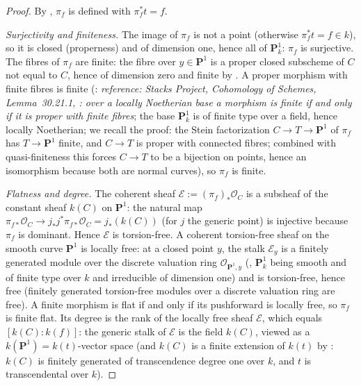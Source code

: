 \begin{proof}
By , \(\pi_f\) is defined
with \(\pi_f^*t=f\).

\emph{Surjectivity and finiteness.}  The image of \(\pi_f\) is not a
point (otherwise \(\pi_f^*t=f\in k\)), so it is closed (properness)
and of dimension one, hence all of \(\mathbf P^1_k\): \(\pi_f\) is
surjective.  The fibres of \(\pi_f\) are finite: the fibre over
\(y\in\mathbf P^1\) is a proper closed subscheme of \(C\) not equal
to \(C\), hence of dimension zero and finite by
.  A proper morphism with finite fibres is
finite (:
\emph{reference: Stacks Project, Cohomology of Schemes,
Lemma~30.21.1, : over a locally Noetherian base a
morphism is finite if and only if it is proper with finite fibres};
the base \(\mathbf P^1_k\) is of finite type over a field, hence
locally Noetherian; we
recall the proof: the Stein factorization
\(C\to T\to\mathbf P^1\) of \(\pi_f\) has \(T\to\mathbf P^1\) finite,
and \(C\to T\) is proper with connected fibres; combined with
quasi-finiteness this forces \(C\to T\) to be a bijection on points,
hence an isomorphism because both are normal curves), so
\(\pi_f\) is finite.

\emph{Flatness and degree.}  The coherent sheaf
\(\mathcal E:=(\pi_f)_*\mathcal O_C\) is a subsheaf of the constant
sheaf \(k(C)\) on \(\mathbf P^1\): the natural map
\(\pi_{f*}\mathcal O_C\to j_*j^*\pi_{f*}\mathcal O_C=j_*(k(C))\) (for
\(j\) the generic point) is injective because \(\pi_f\) is dominant.
Hence \(\mathcal E\) is torsion-free.  A coherent torsion-free sheaf
on the smooth curve \(\mathbf P^1\) is locally free: at a closed
point \(y\), the stalk \(\mathcal E_y\) is a finitely generated
module over the discrete valuation ring \(\mathcal O_{\mathbf P^1,y}\)
(, \(\mathbf P^1_k\) being smooth
and of finite type over \(k\) and irreducible of dimension one) and is
torsion-free, hence free
(finitely generated torsion-free modules over a discrete valuation
ring are free).  A finite morphism is flat if and only if its
pushforward is locally free, so \(\pi_f\) is finite flat.  Its degree
is the rank of the locally free sheaf \(\mathcal E\), which equals
\([k(C):k(f)]\): the generic stalk of \(\mathcal E\) is the field
\(k(C)\), viewed as a \(k(\mathbf P^1)=k(t)\)-vector space (and
\(k(C)\) is a finite extension of \(k(t)\) by
: \(k(C)\) is finitely generated of
transcendence degree one over \(k\), and \(t\) is transcendental
over \(k\)).
\end{proof}

